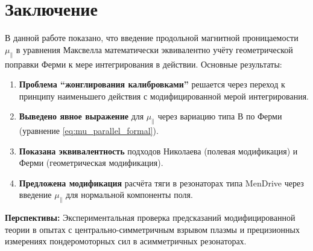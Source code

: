 \documentclass[12pt, a4paper]{article}
\begin{document}
\section{Заключение}

В данной работе показано, что введение продольной магнитной проницаемости $\mu_{\parallel}$ в уравнения Максвелла математически эквивалентно учёту геометрической поправки Ферми к мере интегрирования в действии. Основные результаты:

\begin{enumerate}
    \item \textbf{Проблема ``жонглирования калибровками''} решается через переход к принципу наименьшего действия с модифицированной мерой интегрирования.

    \item \textbf{Выведено явное выражение} для $\mu_{\parallel}$ через вариацию типа В по Ферми (уравнение \ref{eq:mu_parallel_formal}).

    \item \textbf{Показана эквивалентность} подходов Николаева (полевая модификация) и Ферми (геометрическая модификация).

    \item \textbf{Предложена модификация} расчёта тяги в резонаторах типа MenDrive через введение $\mu_{\parallel}$ для нормальной компоненты поля.
\end{enumerate}

\textbf{Перспективы:} Экспериментальная проверка предсказаний модифицированной теории в опытах с центрально-симметричным взрывом плазмы и прецизионных измерениях пондеромоторных сил в асимметричных резонаторах.
\end{document}
